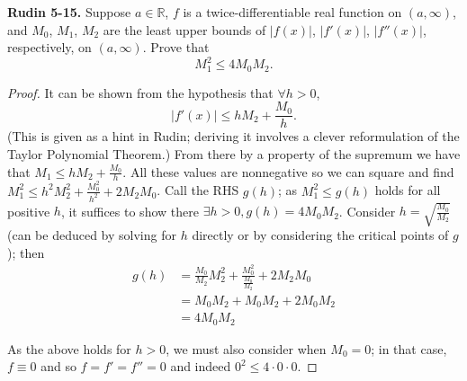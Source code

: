 \documentclass{article}
\newcommand{\R}{\mathbb{R}}
\newcommand{\abs}[1]{\left| #1 \right|}
\newcommand{\problem}[1]{\noindent \textbf{#1}}
\begin{document}

\problem{Rudin 5-15. } %
Suppose $a \in \R$, $f$ is a twice-differentiable real function on $(a, \infty)$, and $M_0$, $M_1$, $M_2$ are the least upper bounds of $\abs{f(x)}$, $\abs{f'(x)}$, $\abs{f''(x)}$, respectively, on $(a, \infty)$. Prove that
$$M_1^2 \le 4 M_0 M_2.$$

\begin{proof}
    It can be shown from the hypothesis that
    $\forall h > 0$,
    $$\abs{f'(x)} \le hM_2 + \frac{M_0}{h}.$$
    (This is given as a hint in Rudin; deriving it involves a clever reformulation of the Taylor Polynomial Theorem.) From there by a property of the supremum we have that $M_1 \le hM_2 + \frac{M_0}{h}$. All these values are nonnegative so we can square and find $M_1^2 \le h^2M_2^2 + \frac{M_0^2}{h^2} + 2M_2 M_0$. Call the RHS $g(h)$; as $M_1^2 \le g(h)$ holds for all positive $h$, it suffices to show there $\exists h > 0, g(h) = 4M_0 M_2$. Consider $h = \sqrt{\frac{M_0}{M_2}}$ (can be deduced by solving for $h$ directly or by considering the critical points of $g$); then
    \begin{align*}
        g(h) &= \frac{M_0}{M_2} M_2^2 + \frac{M_0^2}{\frac{M_0}{M_2}} + 2M_2 M_0 \\
        &= M_0 M_2 + M_0 M_2 + 2M_0 M_2 \\
        &= 4M_0 M_2         
    \end{align*}

    As the above holds for $h > 0$, we must also consider when $M_0 = 0$; in that case, $f \equiv 0$ and so $f = f' = f'' = 0$ and indeed $0^2 \le 4 \cdot 0 \cdot 0$.

\end{proof}
\end{document}
